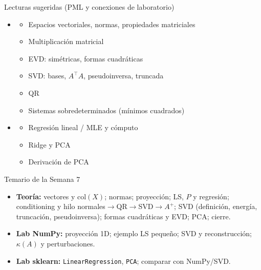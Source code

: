 \begin{frame}{Lecturas sugeridas (PML y conexiones de laboratorio)}
\begin{itemize}\small
  \item {}
  \begin{itemize}\footnotesize
    \item {} Espacios vectoriales, normas, propiedades matriciales
    \item {} Multiplicación matricial
    \item {} EVD: simétricas, formas cuadráticas
    \item {} SVD: bases, \(A^\top A\), pseudoinversa, truncada
    \item {} QR
    \item {} Sistemas sobredeterminados (mínimos cuadrados)
  \end{itemize}
  \item {}
  \begin{itemize}\footnotesize
    \item {} Regresión lineal / MLE y cómputo
    \item {} Ridge y PCA
    \item {} Derivación de PCA
  \end{itemize}
\end{itemize}
\end{frame}

\begin{frame}{Temario de la Semana 7}
\begin{itemize}\small
  \item \textbf{Teoría:} vectores y \(\mathrm{col}(X)\); normas; proyección; LS, \(P\) y regresión; conditioning y hilo normales\(\rightarrow\)QR\(\rightarrow\)SVD\(\rightarrow A^+\); SVD (definición, energía, truncación, pseudoinversa); formas cuadráticas y EVD; PCA; cierre.
  \item \textbf{Lab NumPy:} proyección 1D; ejemplo LS pequeño; SVD y reconstrucción; \(\kappa(A)\) y perturbaciones.
  \item \textbf{Lab sklearn:} \texttt{LinearRegression}, \texttt{PCA}; comparar con NumPy/SVD.
\end{itemize}
\end{frame}

